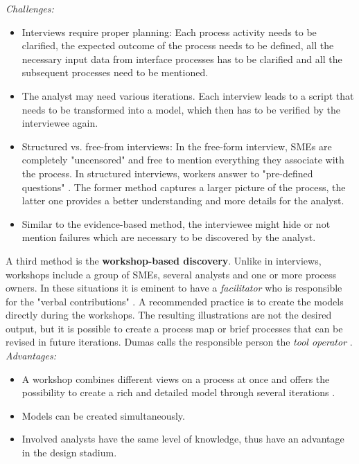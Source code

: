 \textit{Challenges:}
\begin{itemize}
\item Interviews require proper planning: Each process activity needs to be clarified, the expected outcome of the process needs to be defined, all the necessary input data from interface processes has to be clarified and all the subsequent processes need to be mentioned. 
\item The analyst may need various iterations. Each interview leads to a script that needs to be transformed into a model, which then has to be verified by the interviewee again.
\item Structured vs. free-from interviews: In the free-form interview, SMEs are completely "uncensored" \cite{Verner2004} and free to mention everything they associate with the process. In structured interviews, workers answer to "pre-defined questions" \cite{Verner2004}. The former method captures a larger picture of the process, the latter one provides a better understanding and more details for the analyst. 
\item Similar to the evidence-based method, the interviewee might hide or not mention failures which are necessary to be discovered by the analyst.
\end{itemize}

A third method is the \textbf{workshop-based discovery}. Unlike in interviews, workshops include a group of SMEs, several analysts and one or more process owners. In these situations it is eminent to have a \textit{facilitator} who is responsible for the "verbal contributions" \cite{Dumas2013}. A recommended practice is to create the models directly during the workshops. The resulting illustrations are not the desired output, but it is possible to create a process map or brief processes that can be revised in future iterations. Dumas calls the responsible person the \textit{tool operator} \cite{Dumas2013}. \\

\textit{Advantages:}
\begin{itemize}
\item A workshop combines different views on a process at once and offers the possibility to create a rich and detailed model through several iterations \cite{Dumas2013}. 
\item Models can be created simultaneously. 
\item Involved analysts have the same level of knowledge, thus have an advantage in the design stadium.
\end{itemize}

